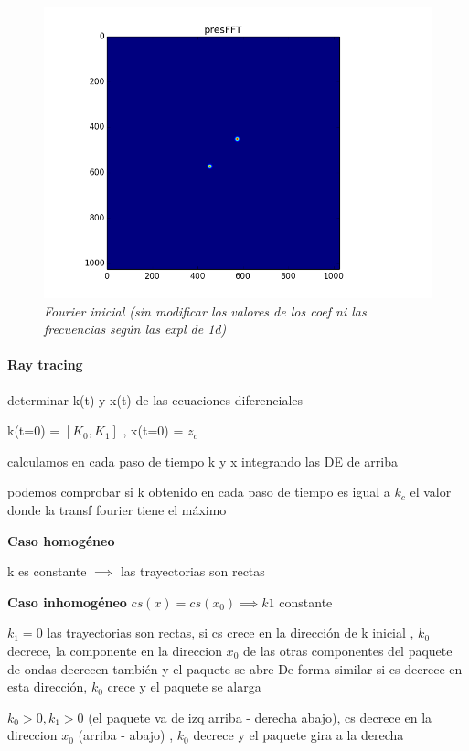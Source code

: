 \documentclass{article}
\begin{document}
\begin{figure}[!ht]
 \centering
 \includegraphics[scale=0.5]{fourier_ini.png}
 \caption{\emph{Fourier inicial (sin modificar los valores de los  coef ni las frecuencias según las expl de 1d)}}
\end{figure}


\paragraph{Ray tracing}
\begin{description}
\item determinar k(t) y x(t) de las ecuaciones diferenciales
\item k(t=0) =  $[K_0, K_1]$ , x(t=0) = $z_c$
\item calculamos en cada paso de tiempo k y x integrando las DE de arriba
\item podemos comprobar si k obtenido en cada paso de tiempo es igual a $k_c$ el valor donde la transf fourier tiene el máximo 


\item 
\item \textbf{Caso homogéneo}
\item k es constante $\implies$ las trayectorias son rectas

\item \textbf{Caso inhomogéneo} $cs(x) = cs(x_0) \implies k1 $ constante  
\begin{description}
\item $k_1 = 0$ las trayectorias son rectas, si cs crece en la dirección de k inicial , $k_0$ decrece, la componente en la direccion $x_0$ de las otras
componentes del paquete de ondas decrecen también y el paquete se abre
De forma similar si cs decrece en esta dirección, $k_0$ crece y el paquete se alarga
\item $k_0>0, k_1>0$ (el paquete va de izq arriba - derecha abajo), cs decrece en la direccion $x_0$ (arriba - abajo) , $k_0$ decrece y el paquete gira a la derecha

\end{description}


\end{description}
\end{document}
